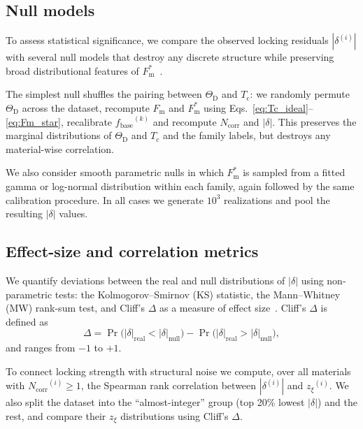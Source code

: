 \documentclass[aps,prb,twocolumn,superscriptaddress,floatfix,nofootinbib]{revtex4-2}
\newcommand{\Tc}{\ensuremath{T_{\mathrm{c}}}}
\newcommand{\ThetaD}{\ensuremath{\Theta_{\mathrm{D}}}}
\newcommand{\Fm}{\ensuremath{F_{\mathrm{m}}}}
\newcommand{\Fmstar}{\ensuremath{{F_{\mathrm{m}}^{\ast}}}}
\newcommand{\fbase}{\ensuremath{{f_{\mathrm{base}}}}}
\newcommand{\Ncorr}{\ensuremath{{N_{\mathrm{corr}}}}}
\newcommand{\deltalock}{\ensuremath{\delta}}
\newcommand{\znoise}{\ensuremath{{z_{\xi}}}}
\begin{document}
\subsection{Null models}

To assess statistical significance, we compare the observed
locking residuals $|\deltalock^{(i)}|$ with several null models
that destroy any discrete structure while preserving
broad distributional features of $\Fmstar$~\cite{Efron1993}.

The simplest null shuffles the pairing between $\ThetaD$ and $\Tc$:
we randomly permute $\ThetaD$ across the dataset, recompute
$\Fm$ and $\Fmstar$ using Eqs.~\eqref{eq:Tc_ideal}--\eqref{eq:Fm_star},
recalibrate $\fbase^{(k)}$ and recompute $\Ncorr$ and $|\deltalock|$.
This preserves the marginal distributions of $\ThetaD$ and $\Tc$
and the family labels, but destroys any material-wise correlation.

We also consider smooth parametric nulls in which $\Fmstar$
is sampled from a fitted gamma or log-normal distribution within
each family, again followed by the same calibration procedure.
In all cases we generate $10^3$ realizations and pool the resulting
$|\deltalock|$ values.


\subsection{Effect-size and correlation metrics}

We quantify deviations between the real and null distributions of
$|\deltalock|$ using non-parametric tests:
the Kolmogorov--Smirnov (KS) statistic,
the Mann--Whitney (MW) rank-sum test,
and Cliff's $\Delta$ as a measure of effect size~\cite{Cliff1993}.
Cliff's $\Delta$ is defined as
\begin{equation}
  \Delta =
  \Pr\bigl(|\deltalock|_{\mathrm{real}} <
           |\deltalock|_{\mathrm{null}}\bigr)
  - \Pr\bigl(|\deltalock|_{\mathrm{real}} >
             |\deltalock|_{\mathrm{null}}\bigr),
\end{equation}
and ranges from $-1$ to $+1$.

To connect locking strength with structural noise we compute,
over all materials with $\Ncorr^{(i)} \ge 1$,
the Spearman rank correlation between $|\deltalock^{(i)}|$
and $\znoise^{(i)}$.
We also split the dataset into the ``almost-integer'' group
(top 20\% lowest $|\deltalock|$) and the rest,
and compare their $\znoise$ distributions using Cliff's $\Delta$.
\end{document}
